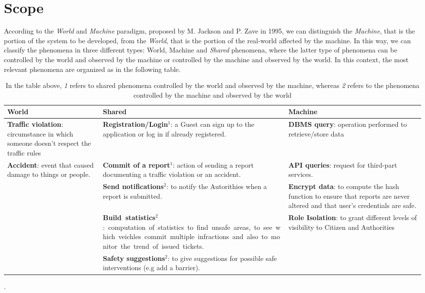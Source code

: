 \documentclass{report}
\begin{document}
\section{Scope}
According to the \textit{World} and \textit{Machine} paradigm, proposed by M. Jackson and P. Zave in 1995, we can distinguish the \textit{Machine}, that is the portion of the system to be developed, from the \textit{World}, that is the portion of the real-world affected by the machine. In this way, we can classify the phenomena in three different types: World, Machine and \textit{Shared} phenomena, where the latter type of phenomena can be controlled by the world and observed by the machine or controlled by the machine and observed by the world.
\newline
In this context, the most relevant phenomena are organized as in the following table.
\clearpage
\begin{table}[!ht]
		\begin{center}
		\begin{tabular}{|C{.28\textwidth}||C{.28\textwidth}||C{.28\textwidth}|}
			\toprule
			\textbf{World} &\textbf{Shared}& \textbf{Machine}\\
			\midrule
			\midrule
			\textbf{Traffic violation}: circumstance in which someone doesn't respect the traffic rules &\textbf{\small{Registration/Login}}$^{1}$: a Guest can sign up to the application or log in if already registered.&\textbf{DBMS query}: operation performed to retrieve/store data\\
			\midrule
			\textbf{Accident}: event that caused damage to things or people.&\textbf{Commit of a report}$^{1}$: action of sending a report documenting a traffic violation or an accident.&\textbf{API queries}: request for third-part services.\\
			\midrule
			&\textbf{Send notifications}$^{2}$: to notify the Autorithies when a report is submitted.&\textbf{Encrypt data}: to compute the hash function to ensure that reports are never altered and that user's credentials are safe.\\
			\midrule
			&\textbf{Build statistics}$^{2}$: computation of statistics to find unsafe areas, to see which veichles commit multiple infractions and also to monitor the trend of issued tickets.&\textbf{Role Isolation}: to grant different levels of visibility to Citizen and Authorities\\ 
			\midrule			
			&\textbf{Safety suggestions}$^{2}$: to give suggestions for possible safe interventions (e.g add a barrier).&\\
			\bottomrule
		\end{tabular}
		\end{center}
		\caption{In the table above, \textit{1} refers to shared phenomena controlled by the world and observed by the machine, whereas \textit{2} refers to the phenomena controlled by the machine and observed by the world}.
		\label{tab:multicol}
	\end{table}
\end{document}
